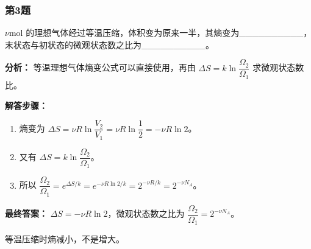 \documentclass[12pt,a4paper]{ctexart}
\begin{document}
\subsubsection*{第3题}
\begin{tcolorbox}[colback=gray!2!white,colframe=black!60,title={题目}]
\(\nu\mathrm{mol}\) 的理想气体经过等温压缩，体积变为原来一半，其熵变为\_\_\_\_\_\_\_\_\_\_，末状态与初状态的微观状态数之比为\_\_\_\_\_\_\_\_\_\_。\par
\end{tcolorbox}
\begin{tcolorbox}[colback=blue!2!white,colframe=blue!55!black,title={完整答案}]
\textbf{分析：}
等温理想气体熵变公式可以直接使用，再由 \(\Delta S=k\ln \dfrac{\Omega_2}{\Omega_1}\) 求微观状态数比。\par
\textbf{解答步骤：}
\begin{enumerate}
\item 熵变为 \(\Delta S=\nu R\ln\dfrac{V_2}{V_1}=\nu R\ln\dfrac12=-\nu R\ln 2\)。
\item 又有 \(\Delta S=k\ln\dfrac{\Omega_2}{\Omega_1}\)。
\item 所以 \(\dfrac{\Omega_2}{\Omega_1}=e^{\Delta S/k}=e^{-\nu R\ln 2/k}=2^{-\nu R/k}=2^{-\nu N_A}\)。
\end{enumerate}
\textbf{最终答案：}
\(\Delta S=-\nu R\ln 2\)，微观状态数之比为 \(\dfrac{\Omega_2}{\Omega_1}=2^{-\nu N_A}\)。\par
\end{tcolorbox}
\begin{tcolorbox}[colback=red!2!white,colframe=red!55!black,title={易错点}]
等温压缩时熵减小，不是增大。\par
\end{tcolorbox}
\end{document}
